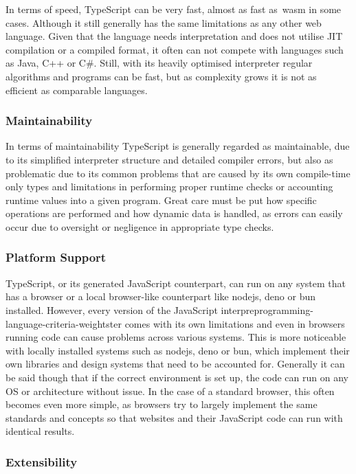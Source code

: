 In terms of speed, TypeScript can be very fast, almost as fast as~\acrshort{wasm} in some cases. Although it still generally has the same limitations as any other web language. Given that the language needs interpretation and does not utilise JIT compilation or a compiled format, it often can not compete with languages such as Java, C++ or C\#. Still, with its heavily optimised interpreter regular algorithms and programs can be fast, but as complexity grows it is not as efficient as comparable languages.

\subsubsection{Maintainability}

In terms of maintainability TypeScript is generally regarded as maintainable, due to its simplified interpreter structure and detailed compiler errors, but also as problematic due to its common problems that are caused by its own compile-time only types and limitations in performing proper runtime checks or accounting runtime values into a given program. Great care must be put how specific operations are performed and how dynamic data is handled, as errors can easily occur due to oversight or negligence in appropriate type checks.

\subsubsection{Platform Support}

TypeScript, or its generated JavaScript counterpart, can run on any system that has a browser or a local browser-like counterpart like \Gls{nodejs}, \Gls{deno} or \Gls{bun} installed. However, every version of the JavaScript interpreprogramming-language-criteria-weightster comes with its own limitations and even in browsers running code can cause problems across various systems. This is more noticeable with locally installed systems such as \Gls{nodejs}, \Gls{deno} or \Gls{bun}, which implement their own libraries and design systems that need to be accounted for. Generally it can be said though that if the correct environment is set up, the code can run on any OS or architecture without issue. In the case of a standard browser, this often becomes even more simple, as browsers try to largely implement the same standards and concepts so that websites and their JavaScript code can run with identical results.

\subsubsection{Extensibility}


